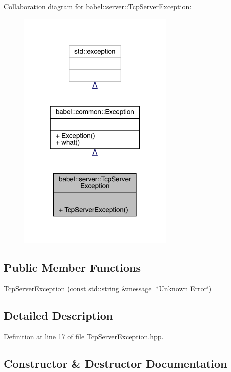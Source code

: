 Collaboration diagram for babel\+:\+:server\+:\+:Tcp\+Server\+Exception\+:\nopagebreak
\begin{figure}[H]
\begin{center}
\leavevmode
\includegraphics[width=214pt]{classbabel_1_1server_1_1_tcp_server_exception__coll__graph}
\end{center}
\end{figure}
\subsection*{Public Member Functions}
\begin{DoxyCompactItemize}
\item 
\mbox{\hyperlink{classbabel_1_1server_1_1_tcp_server_exception_a87286e7a97850595074d27d875b44bb0}{Tcp\+Server\+Exception}} (const std\+::string \&message=\char`\"{}Unknown Error\char`\"{})
\end{DoxyCompactItemize}


\subsection{Detailed Description}


Definition at line 17 of file Tcp\+Server\+Exception.\+hpp.



\subsection{Constructor \& Destructor Documentation}
\mbox{\label{classbabel_1_1server_1_1_tcp_server_exception_a87286e7a97850595074d27d875b44bb0}} 
